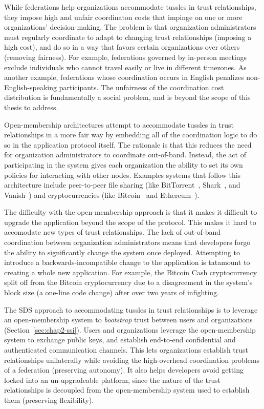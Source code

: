 While federations help organizations accommodate
tussles in trust relationships, they impose high and unfair coordinaton costs
that impinge on one or more organizations' decision-making.  The problem is 
that organization administrators must regularly coordinate to adapt
to changing trust relationships (imposing a high cost), and do so in a way that
favors certain organizations over others (removing fairness).  For example,
federations governed by in-person meetings exclude individuals who cannot
travel easily or live in different timezones.
As another example, federations whose coordination occurs in English
penalizes non-English-speaking participants.  The unfairness of the
coordination cost distribution is fundamentally a social problem, and is beyond
the scope of this thesis to address.

Open-membership architectures attempt to accommodate tussles in trust
relationships in a more fair way by embedding all of the coordination logic to do so in the
application protocol itself.  The rationale is
that this reduces the need for organization administrators to coordinate
out-of-band.  Instead, the act of participating in the system gives
each organization the ability to set its own policies for interacting with other
nodes.  Examples systems that follow this architecture include peer-to-peer file sharing
(like BitTorrent~\cite{bittorrent}, Shark~\cite{shark}, and Vanish~\cite{vanish})
and cryptocurrencies (like Bitcoin~\cite{bitcoin} and Ethereum~\cite{ethereum}).

The difficulty with the open-membership approach is that
it makes it difficult to upgrade the application beyond the scope of the
protocol.  This makes it hard to accomodate new types of trust relationships.
The lack of out-of-band coordination between organization
administrators means that developers forgo the ability to significantly change the
system once deployed.  Attempting to introduce a backwards-incompatible change to the
application is tatamount to creating a whole new application.  For example,
the Bitcoin Cash cryptocurrency~\cite{bcash} split off from the Bitcoin
cryptocurrency due to a disagreement in the system's block size (a one-line code
change) after over two years of infighting.

The SDS approach to accommodating tussles in trust relationships is to leverage
an open-membership system to \emph{bootstrap} trust between
users and organizations (Section~\ref{sec:chap2-ssi}).  Users and
organizations leverage the open-membership system to exchange public keys, and
establish end-to-end confidential and authenticated communication channels.
This lets organizations establish trust relationships unilaterally while
avoiding the high-overhead coordination problems of a
federation (preserving autonomy).
It also helps developers avoid getting locked into an un-upgradeable platform,
since the nature of the trust relationships is decoupled from the
open-membership system used to establish them (preserving flexibility).

